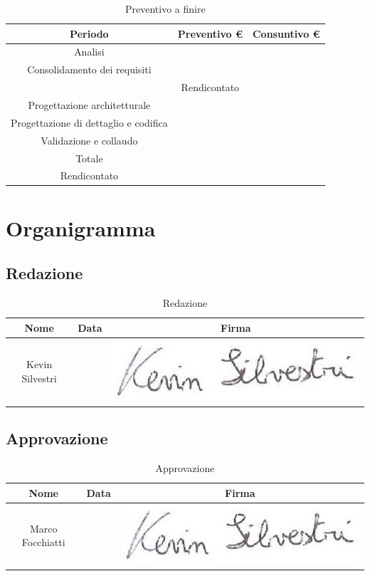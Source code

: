 \documentclass[./PianodiProgetto.tex]{subfiles}
\begin{document}
\begin{table}[H]
	\centering
	\begin{tabular}{|c|c|c|}
		\hline
		Periodo&Preventivo €&Consuntivo € \\ \hline
		Analisi& &  \\ \hline
		Consolidamento dei requisiti& &  \\ \hline
		 &Rendicontato&  \\ \hline
		Progettazione architetturale& &  \\ \hline
		Progettazione di dettaglio e codifica& &  \\ \hline
		Validazione e collaudo& &  \\ \hline
		Totale& &  \\ \hline
		Rendicontato& &  \\ \hline
	\end{tabular}
	\caption{Preventivo a finire}
\end{table}

\appendix
\chapter{Organigramma}

\section{Redazione}
\begin{table}[H]
	\centering
	\begin{tabular}{|c|c|c|}
		\hline
		Nome&Data&Firma \\ \hline
		Kevin Silvestri& \@date &\includegraphics[scale=0.5]{img/firme/SilvestriKevin} \\
		\hline
	\end{tabular}
	\caption{Redazione}
\end{table}

\section{Approvazione}
\begin{table}[H]
	\centering
	\begin{tabular}{|c|c|c|}
		\hline
		Nome&Data&Firma \\ \hline
		Marco Focchiatti& \@date & \includegraphics[scale=0.5]{img/firme/SilvestriKevin} \\
		\hline
	\end{tabular}
	\caption{Approvazione}
\end{table}
\end{document}
